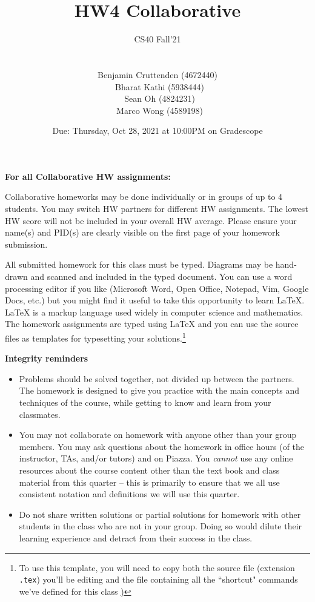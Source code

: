 \documentclass[12pt, oneside]{article}
\title{HW4 Collaborative}
\author{CS40 Fall'21\\\\\\
Benjamin Cruttenden (4672440)\\\
Bharat Kathi (5938444)\\\
Sean Oh (4824231)\\\
Marco Wong (4589198)}
\date{Due: Thursday, Oct 28, 2021 at 10:00PM on Gradescope}
\begin{document}
\maketitle

{\bf For all Collaborative HW assignments:}

Collaborative homeworks may be done individually or in groups of up to 4 students. You may switch HW partners for different HW assignments. The lowest HW score will not be included in your overall HW average. Please ensure your name(s) and PID(s) are clearly visible on the first page of your homework submission.

All submitted homework for this class must be typed. Diagrams may be hand-drawn and scanned and included in the typed document. You can use a word processing editor if you like (Microsoft Word, Open Office, Notepad, Vim, Google Docs, etc.) but you might find it useful to take this opportunity to learn LaTeX. LaTeX is a markup language used widely in computer science and mathematics. The homework assignments are typed using LaTeX and you can use the source files as templates for typesetting your solutions.\footnote{To use this template, you will need to copy both the source file (extension \texttt{.tex})  you'll be editing
and the file containing all the ``shortcut" commands we've defined for this class \href{https://drive.google.com/file/d/1FmQvgByKnNjTpIkAUw31TGWYrQZM-HK0/view?usp=sharing})}


{\bf Integrity reminders}
\begin{itemize}
\item Problems should be solved together, not divided up between the partners. The homework is
designed to give you practice with the main concepts and techniques of the course, while getting to know and learn from your classmates.
\item You may not collaborate on homework with anyone other than your group members.
You may ask questions about the homework in office hours (of the instructor, TAs, and/or tutors) and 
on Piazza.  You \emph{cannot} use any online resources about the course content other than the text
book and class material from this quarter -- this is primarily to ensure that we all use consistent notation and
definitions we will use this quarter.
\item Do not share written solutions or partial solutions for homework with other students in the class who are not in your group. Doing so would dilute their learning experience and detract from their success in the class.
\end{itemize}
\end{document}
